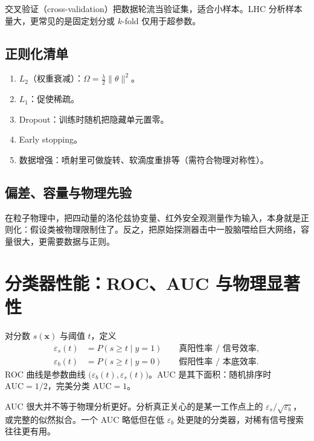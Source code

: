 \documentclass[11pt,a4paper]{article}
\theoremstyle{definition}
\theoremstyle{plain}
\theoremstyle{remark}
\begin{document}
交叉验证（cross-validation）把数据轮流当验证集，适合小样本。LHC 分析样本量大，更常见的是固定划分或 $k$-fold 仅用于超参数。

\subsection{正则化清单}

\begin{enumerate}[leftmargin=1.6em]
  \item $L_2$（权重衰减）：$\Omega=\frac\lambda2\|\theta\|^2$。
  \item $L_1$：促使稀疏。
  \item Dropout：训练时随机把隐藏单元置零。
  \item Early stopping。
  \item 数据增强：喷射里可做旋转、软滴度重排等（需符合物理对称性）。
\end{enumerate}

\subsection{偏差、容量与物理先验}

在粒子物理中，把四动量的洛伦兹协变量、红外安全观测量作为输入，本身就是正则化：假设类被物理限制住了。反之，把原始探测器击中一股脑喂给巨大网络，容量很大，更需要数据与正则。

\section{分类器性能：ROC、AUC 与物理显著性}
\label{sec:roc}

对分数 $s(\mathbf{x})$ 与阈值 $t$，定义
\begin{align}
  \varepsilon_s(t)&=P(s\ge t\mid y=1)\qquad\text{真阳性率 / 信号效率},\\
  \varepsilon_b(t)&=P(s\ge t\mid y=0)\qquad\text{假阳性率 / 本底效率}.
\end{align}
ROC 曲线是参数曲线 $\bigl(\varepsilon_b(t),\varepsilon_s(t)\bigr)$。AUC 是其下面积：随机排序时 $\mathrm{AUC}=1/2$，完美分类 $\mathrm{AUC}=1$。

\begin{warnbox}
AUC 很大并不等于物理分析更好。分析真正关心的是某一工作点上的 $\varepsilon_s/\sqrt{\varepsilon_b}$，或完整的似然拟合。一个 AUC 略低但在低 $\varepsilon_b$ 处更陡的分类器，对稀有信号搜索往往更有用。
\end{warnbox}
\end{document}
